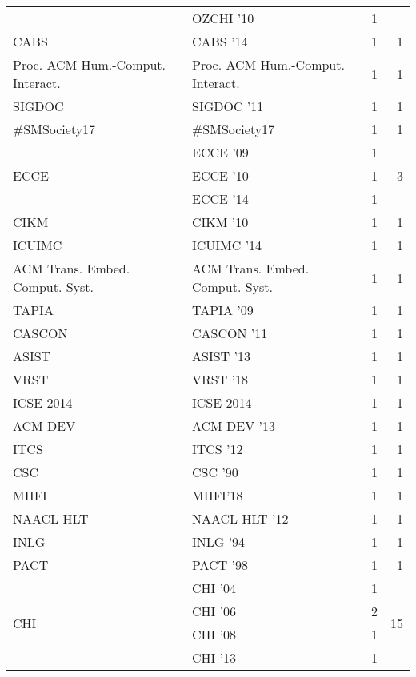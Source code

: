 \begin{table*}[t]
\begin{tabular}{llrr}
& OZCHI '10 & 1 &\\
\multirow{1}{*}{CABS } & CABS '14 & 1 & \multirow{1}{*}{1}\\
\multirow{1}{*}{Proc. ACM Hum.-Comput. Interact.} & Proc. ACM Hum.-Comput. Interact. & 1 & \multirow{1}{*}{1}\\
\multirow{1}{*}{SIGDOC } & SIGDOC '11 & 1 & \multirow{1}{*}{1}\\
\multirow{1}{*}{\#SMSociety17} & \#SMSociety17 & 1 & \multirow{1}{*}{1}\\
\multirow{3}{*}{ECCE } & ECCE '09 & 1 & \multirow{3}{*}{3}\\
& ECCE '10 & 1 &\\
& ECCE '14 & 1 &\\
\multirow{1}{*}{CIKM } & CIKM '10 & 1 & \multirow{1}{*}{1}\\
\multirow{1}{*}{ICUIMC } & ICUIMC '14 & 1 & \multirow{1}{*}{1}\\
\multirow{1}{*}{ACM Trans. Embed. Comput. Syst.} & ACM Trans. Embed. Comput. Syst. & 1 & \multirow{1}{*}{1}\\
\multirow{1}{*}{TAPIA } & TAPIA '09 & 1 & \multirow{1}{*}{1}\\
\multirow{1}{*}{CASCON } & CASCON '11 & 1 & \multirow{1}{*}{1}\\
\multirow{1}{*}{ASIST } & ASIST '13 & 1 & \multirow{1}{*}{1}\\
\multirow{1}{*}{VRST } & VRST '18 & 1 & \multirow{1}{*}{1}\\
\multirow{1}{*}{ICSE 2014} & ICSE 2014 & 1 & \multirow{1}{*}{1}\\
\multirow{1}{*}{ACM DEV } & ACM DEV '13 & 1 & \multirow{1}{*}{1}\\
\multirow{1}{*}{ITCS } & ITCS '12 & 1 & \multirow{1}{*}{1}\\
\multirow{1}{*}{CSC } & CSC '90 & 1 & \multirow{1}{*}{1}\\
\multirow{1}{*}{MHFI} & MHFI'18 & 1 & \multirow{1}{*}{1}\\
\multirow{1}{*}{NAACL HLT } & NAACL HLT '12 & 1 & \multirow{1}{*}{1}\\
\multirow{1}{*}{INLG } & INLG '94 & 1 & \multirow{1}{*}{1}\\
\multirow{1}{*}{PACT } & PACT '98 & 1 & \multirow{1}{*}{1}\\
\multirow{11}{*}{CHI } & CHI '04 & 1 & \multirow{11}{*}{15}\\
& CHI '06 & 2 &\\
& CHI '08 & 1 &\\
& CHI '13 & 1 &\\

\end{tabular}
\end{table*}
